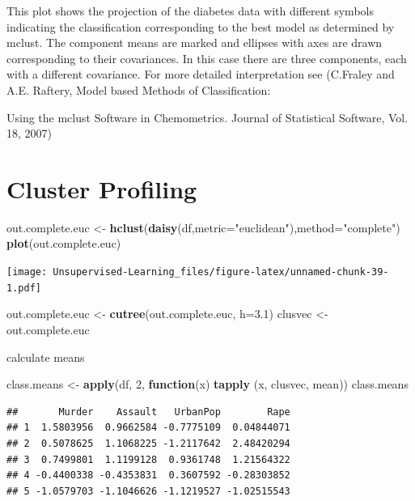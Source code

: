 \documentclass[
]{book}
\newenvironment{Shaded}{\begin{snugshade}}{\end{snugshade}}
\newcommand{\ControlFlowTok}[1]{\textcolor[rgb]{0.13,0.29,0.53}{\textbf{#1}}}
\newcommand{\DataTypeTok}[1]{\textcolor[rgb]{0.13,0.29,0.53}{#1}}
\newcommand{\DecValTok}[1]{\textcolor[rgb]{0.00,0.00,0.81}{#1}}
\newcommand{\FloatTok}[1]{\textcolor[rgb]{0.00,0.00,0.81}{#1}}
\newcommand{\KeywordTok}[1]{\textcolor[rgb]{0.13,0.29,0.53}{\textbf{#1}}}
\newcommand{\NormalTok}[1]{#1}
\newcommand{\StringTok}[1]{\textcolor[rgb]{0.31,0.60,0.02}{#1}}
\begin{document}
This plot shows the projection of the diabetes data with different symbols indicating the classification
corresponding to the best model as determined by mclust. The component means are marked and ellipses
with axes are drawn corresponding to their covariances. In this case there are three components, each with a
different covariance.
For more detailed interpretation see (C.Fraley and A.E. Raftery, Model based Methods of Classification:

Using the mclust Software in Chemometrics. Journal of Statistical Software, Vol. 18, 2007)

\hypertarget{cluster-profiling}{%
\section{Cluster Profiling}\label{cluster-profiling}}

\begin{Shaded}
\begin{Highlighting}[]
\NormalTok{out.complete.euc <-}\StringTok{ }\KeywordTok{hclust}\NormalTok{(}\KeywordTok{daisy}\NormalTok{(df,}\DataTypeTok{metric=}\StringTok{"euclidean"}\NormalTok{),}\DataTypeTok{method=}\StringTok{"complete"}\NormalTok{)}
\KeywordTok{plot}\NormalTok{(out.complete.euc)}
\end{Highlighting}
\end{Shaded}

\texttt{[image: Unsupervised-Learning\_files/figure-latex/unnamed-chunk-39-1.pdf]}

\begin{Shaded}
\begin{Highlighting}[]
\NormalTok{out.complete.euc <-}\StringTok{ }\KeywordTok{cutree}\NormalTok{(out.complete.euc, }\DataTypeTok{h=}\FloatTok{3.1}\NormalTok{)}
\NormalTok{clusvec <-}\StringTok{ }\NormalTok{out.complete.euc}
\end{Highlighting}
\end{Shaded}

calculate means

\begin{Shaded}
\begin{Highlighting}[]
\NormalTok{class.means <-}\StringTok{ }\KeywordTok{apply}\NormalTok{(df, }\DecValTok{2}\NormalTok{, }\ControlFlowTok{function}\NormalTok{(x) }\KeywordTok{tapply}\NormalTok{ (x, clusvec, mean))}
\NormalTok{class.means}
\end{Highlighting}
\end{Shaded}

\begin{verbatim}
##       Murder    Assault   UrbanPop        Rape
## 1  1.5803956  0.9662584 -0.7775109  0.04844071
## 2  0.5078625  1.1068225 -1.2117642  2.48420294
## 3  0.7499801  1.1199128  0.9361748  1.21564322
## 4 -0.4400338 -0.4353831  0.3607592 -0.28303852
## 5 -1.0579703 -1.1046626 -1.1219527 -1.02515543
\end{verbatim}
\end{document}
